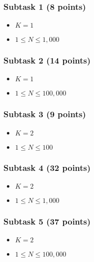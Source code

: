 \documentclass{report}
\begin{document}
\subsubsection{Subtask 1 (8 points)}
\begin{itemize} \itemsep1pt \parskip0pt
\item $K = 1$
\item $1 \le N \le 1,000$
\end{itemize}

\subsubsection{Subtask 2 (14 points)}
\begin{itemize} \itemsep1pt \parskip0pt
\item $K = 1$
\item $1 \le N \le 100,000$
\end{itemize}

\subsubsection{Subtask 3 (9 points)}
\begin{itemize} \itemsep1pt \parskip0pt
\item $K = 2$
\item $1 \le N \le 100$
\end{itemize}

\subsubsection{Subtask 4 (32 points)}
\begin{itemize} \itemsep1pt \parskip0pt
\item $K = 2$
\item $1 \le N \le 1,000$
\end{itemize}

\subsubsection{Subtask 5 (37 points)}
\begin{itemize} \itemsep1pt \parskip0pt
\item $K = 2$
\item $1 \le N \le 100,000$
\end{itemize}
\end{document}
